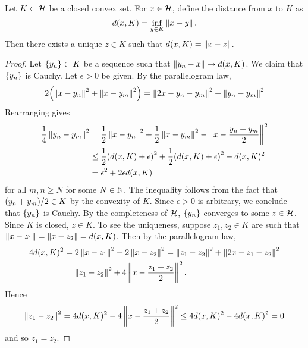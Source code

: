 \begin{theorem}\label{thm:hilbert_proj}
    Let $K\subset\mathcal{H}$ be a closed convex set. For $x\in\mathcal{H}$, define the distance 
    from $x$ to $K$ as
    \begin{equation*}
        d(x,K) = \inf_{y\in K}\left\lVert {x-y} \right\rVert.
    \end{equation*}
    Then there exists a unique $z\in K$ such that $d(x,K) = \left\lVert {x-z} \right\rVert$.
\end{theorem}
\begin{proof}
    Let $\left\{ {y_n} \right\}\subset K$ be a sequence such that $\left\lVert {y_n-x} \right\rVert\to d(x,K)$. 
    We claim that $\left\{ {y_n} \right\}$ is Cauchy. Let $\epsilon>0$ be given. By the 
    parallelogram law, 
    \begin{equation*}
        2\pth{\norm{x-y_n}^2 + \norm{x-y_m}^2} = \norm{2x-y_n-y_m}^2 + \norm{y_n-y_m}^2
    \end{equation*}
    Rearranging gives 
    \begin{equation*}
        \begin{split}
            \frac{1}{4}\norm{y_n-y_m}^2 
            &= \frac{1}{2}\norm{x-y_n}^2 + \frac{1}{2}\norm{x-y_m}^2 - \norm{x-\frac{y_n+y_m}{2}}^2 \\
            &\leq \frac{1}{2}\pth{d(x,K)+\epsilon}^2 + \frac{1}{2}\pth{d(x,K)+\epsilon}^2 - d(x,K)^2 \\ 
            &= \epsilon^2 + 2\epsilon d(x,K)
        \end{split}
    \end{equation*}
    for all $m,n\geq N$ for some $N\in\mathbb{N}$. The inequality follows from the fact 
    that $\pth{y_n+y_m}/2\in K$ by the convexity of $K$. Since $\epsilon>0$ is 
    arbitrary, we conclude that $\left\{ {y_n} \right\}$ is Cauchy. By the completeness of 
    $\mathcal{H}$, $\left\{ {y_n} \right\}$ converges to some $z\in\mathcal{H}$. Since $K$ is closed, 
    $z\in K$. To see the uniqueness, suppose $z_1,z_2\in K$ are such that 
    $\left\lVert {x-z_1} \right\rVert = \left\lVert {x-z_2} \right\rVert = d(x,K)$. Then by the parallelogram law, 
    \begin{equation*}
        \begin{split}
            4d(x,K)^2 &= 2\left\lVert {x-z_1} \right\rVert^2 + 2\left\lVert {x-z_2} \right\rVert^2 
            = \left\lVert {z_1-z_2} \right\rVert^2 + \left\lVert {2x-z_1-z_2} \right\rVert^2 \\
            &= \left\lVert {z_1-z_2} \right\rVert^2 + 4\left\lVert {x-\frac{z_1+z_2}{2}} \right\rVert^2. 
        \end{split}
    \end{equation*}
    Hence 
    \begin{equation*}
        \left\lVert {z_1-z_2} \right\rVert^2 = 4d(x,K)^2 - 4\left\lVert {x-\frac{z_1+z_2}{2}} \right\rVert^2 
        \leq 4d(x,K)^2 - 4d(x,K)^2 = 0
    \end{equation*}
    and so $z_1 = z_2$.
\end{proof}

